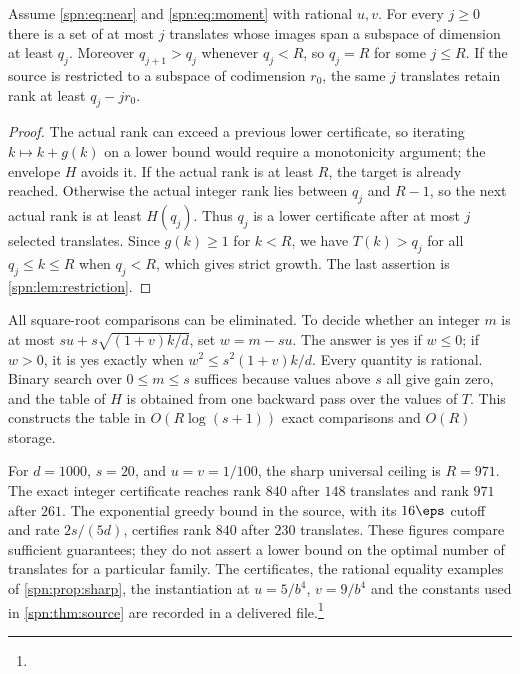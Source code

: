\begin{proposition}\label{spn:prop:envelope}
Assume \eqref{spn:eq:near} and \eqref{spn:eq:moment} with rational $u,v$. For
every $j\ge0$ there is a set of at most $j$ translates whose images span a
subspace of dimension at least $q_j$. Moreover $q_{j+1}>q_j$ whenever $q_j<R$,
so $q_j=R$ for some $j\le R$. If the source is restricted to a subspace of
codimension $r_0$, the same $j$ translates retain rank at least $q_j-jr_0$.
\end{proposition}

\begin{proof}
The actual rank can exceed a previous lower certificate, so iterating
$k\mapsto k+g(k)$ on a lower bound would require a monotonicity argument; the
envelope $H$ avoids it. If the actual rank is at least $R$, the target is
already reached. Otherwise the actual integer rank lies between $q_j$ and
$R-1$, so the next actual rank is at least $H(q_j)$. Thus $q_j$ is a lower
certificate after at most $j$ selected translates. Since $g(k)\ge1$ for $k<R$,
we have $T(k)>q_j$ for all $q_j\le k\le R$ when $q_j<R$, which gives strict
growth. The last assertion is \cref{spn:lem:restriction}.
\end{proof}

All square-root comparisons can be eliminated. To decide whether an integer
$m$ is at most $su+s\sqrt{(1+v)k/d}$, set $w=m-su$. The answer is yes if
$w\le0$; if $w>0$, it is yes exactly when $w^2\le s^2(1+v)k/d$. Every quantity
is rational. Binary search over $0\le m\le s$ suffices because values above
$s$ all give gain zero, and the table of $H$ is obtained from one backward pass
over the values of $T$. This constructs the table in $O(R\log(s+1))$ exact
comparisons and $O(R)$ storage.

\begin{example}\label{spn:ex:certificate}
For $d=1000$, $s=20$, and $u=v=1/100$, the sharp universal ceiling is $R=971$.
The exact integer certificate reaches rank $840$ after $148$ translates and
rank $971$ after $261$. The exponential greedy bound in the source, with its
$16\eps$ cutoff and rate $2s/(5d)$, certifies rank $840$ after $230$
translates. These figures compare sufficient guarantees; they do not assert a
lower bound on the optimal number of translates for a particular family. The
certificates, the rational equality examples of \cref{spn:prop:sharp}, the
instantiation at $u=5/b^4$, $v=9/b^4$ and the constants used in
\cref{spn:thm:source} are recorded in a delivered
file.\footnote{}
\end{example}

